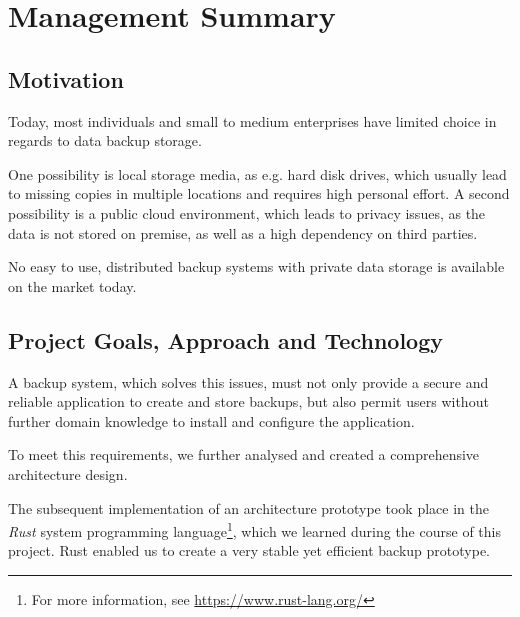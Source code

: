 
\chapter{Management Summary}
\addchaptertocentry{\abstractname} %



\section*{Motivation} %
Today, most individuals and small to medium enterprises have limited choice in regards to data backup storage.

One possibility is local storage media, as e.g. hard disk drives, which usually lead to missing copies in multiple locations and requires high personal effort. A second possibility is a public cloud environment, which leads to privacy issues, as the data is not stored on premise, as well as a high dependency on third parties.

No easy to use, distributed backup systems with private data storage is available on the market today.

\section*{Project Goals, Approach and Technology}
A backup system, which solves this issues, must not only provide a secure and reliable application to create and store backups, but also permit users without further domain knowledge to install and configure the application.

To meet this requirements, we further analysed and created a comprehensive architecture design.

The subsequent implementation of an architecture prototype took place in the \emph{Rust} system programming language\footnote{For more information, see \url{https://www.rust-lang.org/}}, which we learned during the course of this project. Rust enabled us to create a very stable yet efficient backup prototype.

